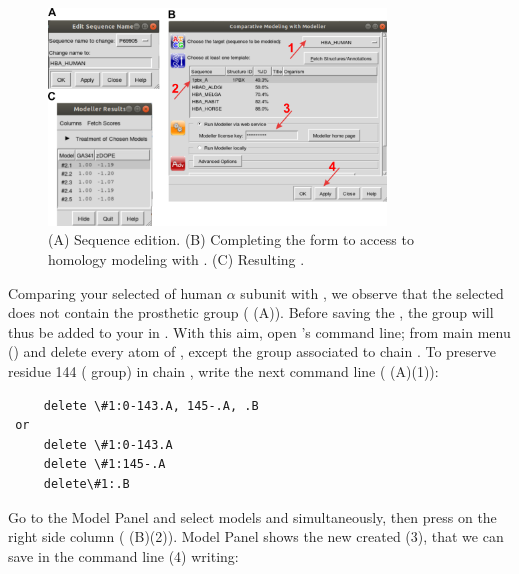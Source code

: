   \begin{figure}[H]
  \centering 
  \captionsetup{width=.7\linewidth} 
  \includegraphics[width=0.80\textwidth]{Images/Fig15}
  \caption{(A) Sequence edition. (B) Completing the form to access to homology modeling with \modeller. (C) Resulting .}
  \label{fig:modeller}
  \end{figure}
 
 Comparing your selected  of human  $\alpha$ subunit with  , we observe that the selected   does not contain the  prosthetic group ( (A)). Before saving the , the   group will thus be added to your  in \chimera. With this aim, open \chimera's command line; from \chimera main menu () and delete every atom of  , except the  group associated to chain . To preserve residue 144 ( group) in chain , write the next command line ( (A)(1)):
 \begin{verbatim}
     delete \#1:0-143.A, 145-.A, .B
 or
     delete \#1:0-143.A
     delete \#1:145-.A
     delete\#1:.B
 \end{verbatim}
 
 Go to the Model Panel and select models  and  simultaneously, then press  on the right side column ( (B)(2)). Model Panel shows the new  created  (3), that we can save in the command line (4) writing:\\
 
 \\
 
